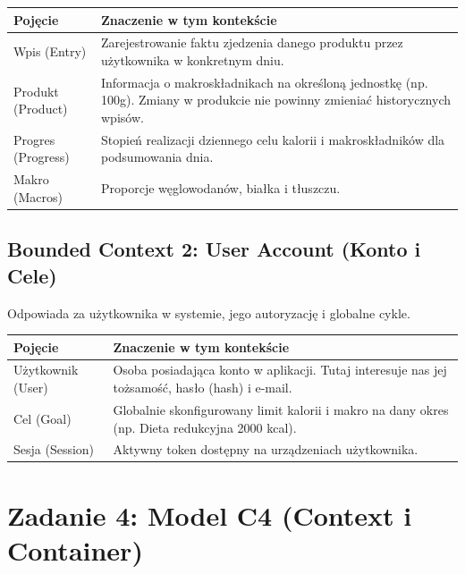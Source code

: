 \documentclass[12pt,a4paper]{article}
\begin{document}
\begin{table}[H]
    \centering
    \begin{tabularx}{\textwidth}{|l|X|}
        \hline
        \textbf{Pojęcie} & \textbf{Znaczenie w tym kontekście} \\
        \hline
        Wpis (Entry) & Zarejestrowanie faktu zjedzenia danego produktu przez użytkownika w konkretnym dniu. \\
        \hline
        Produkt (Product) & Informacja o makroskładnikach na określoną jednostkę (np. 100g). Zmiany w produkcie nie powinny zmieniać historycznych wpisów. \\
        \hline
        Progres (Progress) & Stopień realizacji dziennego celu kalorii i makroskładników dla podsumowania dnia. \\
        \hline
        Makro (Macros) & Proporcje węglowodanów, białka i tłuszczu. \\
        \hline
    \end{tabularx}
\end{table}

\subsection{Bounded Context 2: User Account (Konto i Cele)}
Odpowiada za użytkownika w systemie, jego autoryzację i globalne cykle.

\begin{table}[H]
    \centering
    \begin{tabularx}{\textwidth}{|l|X|}
        \hline
        \textbf{Pojęcie} & \textbf{Znaczenie w tym kontekście} \\
        \hline
        Użytkownik (User) & Osoba posiadająca konto w aplikacji. Tutaj interesuje nas jej tożsamość, hasło (hash) i e-mail. \\
        \hline
        Cel (Goal) & Globalnie skonfigurowany limit kalorii i makro na dany okres (np. Dieta redukcyjna 2000 kcal). \\
        \hline
        Sesja (Session) & Aktywny token dostępny na urządzeniach użytkownika. \\
        \hline
    \end{tabularx}
\end{table}

\section{Zadanie 4: Model C4 (Context i Container)}
\end{document}
